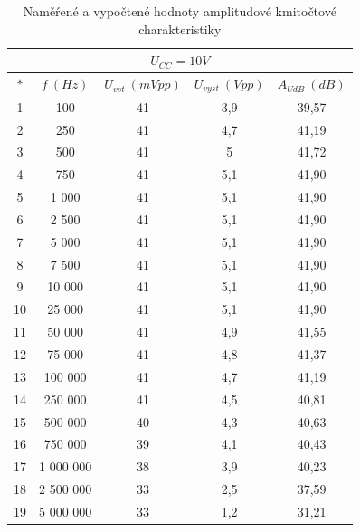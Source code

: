 \documentclass[a4paper, czech]{article}
\begin{document}
\begin{table}[H]
    \centering
    \begin{tabular}{ccccc}
        \multicolumn{5}{c}{$U_{CC} = 10V$} \\
        \toprule
        $*$  & $f\ (Hz)$    & $U_{vst}\ (mVpp)$ & $U_{vyst}\ (Vpp)$ & $A_{UdB}\ (dB)$ \\
        \midrule
        1  & 100       & 41        & 3,9       & 39,57     \\
        2  & 250       & 41        & 4,7       & 41,19     \\
        3  & 500       & 41        & 5         & 41,72     \\
        4  & 750       & 41        & 5,1       & 41,90     \\
        5  & 1 000     & 41        & 5,1       & 41,90     \\
        6  & 2 500     & 41        & 5,1       & 41,90     \\
        7  & 5 000     & 41        & 5,1       & 41,90     \\
        8  & 7 500     & 41        & 5,1       & 41,90     \\
        9  & 10 000    & 41        & 5,1       & 41,90     \\
        10 & 25 000    & 41        & 5,1       & 41,90     \\
        11 & 50 000    & 41        & 4,9       & 41,55     \\
        12 & 75 000    & 41        & 4,8       & 41,37     \\
        13 & 100 000   & 41        & 4,7       & 41,19     \\
        14 & 250 000   & 41        & 4,5       & 40,81     \\
        15 & 500 000   & 40        & 4,3       & 40,63     \\
        16 & 750 000   & 39        & 4,1       & 40,43     \\
        17 & 1 000 000 & 38        & 3,9       & 40,23     \\
        18 & 2 500 000 & 33        & 2,5       & 37,59     \\
        19 & 5 000 000 & 33        & 1,2       & 31,21     \\
        \bottomrule
    \end{tabular}
    \caption{Naměŕené a vypočtené hodnoty amplitudové kmitočtové charakteristiky}
\end{table}
\end{document}
